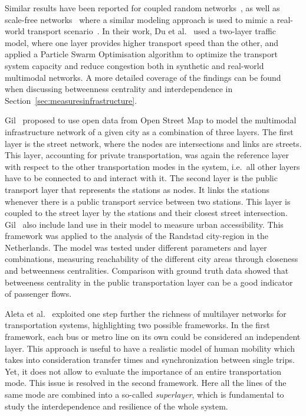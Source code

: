 Similar results have been reported for coupled random networks~\cite{gao2017comprehensive}, as well as scale-free networks~\cite{zhuo2011traffic} where a similar modeling approach is used to mimic a real-world transport scenario~\cite{du2016physics}. In their work, Du et al.~\cite{du2016physics} used a two-layer traffic model, where one layer provides higher transport speed than the other, and applied a Particle Swarm Optimisation algorithm to optimize the transport system capacity and reduce congestion both in synthetic and real-world multimodal networks. A more detailed coverage of the findings can be found when discussing betweenness centrality and interdependence in Section~\ref{sec:measuresinfrastructure}. 

Gil~\cite{gil2014configuration} proposed to use open data from Open Street Map to model the multimodal infrastructure network of a given city as a combination of three layers. The first layer is the street network, where the nodes are intersections and links are streets. This layer, accounting for private transportation, was again the reference layer with respect to the other transportation modes in the system, i.e.~all other layers have to be connected to and interact with it. The second layer is the public transport layer that represents the stations as nodes. It links the stations whenever there is a public transport service between two stations. This layer is coupled to the street layer by the stations and their closest street intersection. Gil~\cite{gil2014configuration} also include land use in their model to measure urban accessibility. This framework was applied to the analysis of the Randstad city-region in the Netherlands. The model was tested under different parameters and layer combinations, measuring reachability of the different city areas through closeness and betweenness centralities. Comparison with ground truth data showed that betweeness centrality in the public transportation layer can be a good indicator of passenger flows.

Aleta et al.~\cite{Aleta2017Multilayer} exploited one step further the richness of multilayer networks for transportation systems, highlighting two possible frameworks. In the first framework, each bus or metro line on its own could be considered an independent layer. This approach is useful to have a realistic model of human mobility which takes into consideration transfer times and synchronization between single trips. Yet, it does not allow to evaluate the importance of an entire transportation mode. This issue is resolved in the second framework. Here all the lines of the same mode are combined into a so-called \textit{superlayer}, which is fundamental to study the interdependence and resilience of the whole system. 

